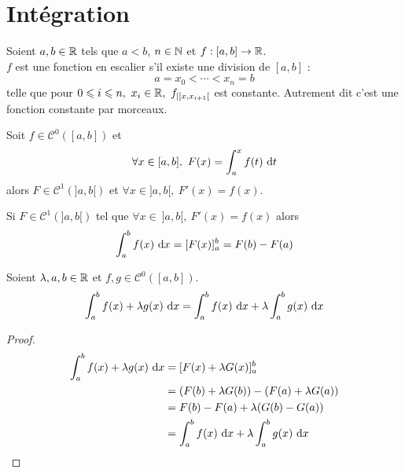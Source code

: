 \chapter{Intégration}
\def\arraystretch{1}

\begin{definition}
	Soient $a, b \in \mathbb{R}$ tels que $a < b$, $n \in \mathbb{N}$ et $f : [a, b] \to \mathbb{R}$.
	\\
	$f$ est une fonction en escalier s'il existe une division de $[a, b]$ :
	\[ a = x_0 < \cdots < x_n = b \]
	telle que pour $0 \leqslant i \leqslant n,\ x_i \in \mathbb{R},\  f_{| ]x, x_{i+1}[}$ est constante.
	Autrement dit c'est une fonction constante par morceaux.
\end{definition}

\begin{theorem}
	Soit $f \in \mathcal{C}^0([a, b])$ et 
	\begin{align*}
		\forall x \in [a, b],\ F(x) = \int_a^x f(t) \ \diffd t
	\end{align*}
	alors $F \in \mathcal{C}^1(]a, b[)$ et $\forall x \in ]a, b[,\ F'(x) = f(x)$.    
\end{theorem}

\begin{corollary}
    Si $F \in \mathcal{C}^1(]a, b[)$ tel que $\forall x \in \ ]a, b[,\ F'(x) = f(x)$ alors
	\begin{align*}
		\int_a^b f(x) \ \diffd x = [F(x)]_a^b = F(b) - F(a) 
	\end{align*}
\end{corollary}

\begin{proposition}
	Soient $\lambda, a, b \in \mathbb{R}$ et $f, g \in \mathcal{C}^0([a, b])$.
	\begin{align*}
		\int_a^b f(x) + \lambda g(x) \ \diffd x = \int_a^b f(x) \ \diffd x + \lambda \int_a^b g(x) \ \diffd x 
	\end{align*}
\end{proposition}

\begin{proof}
    \begin{align*}
        \int_{a}^{b} f(x) + \lambda g(x) \ \diffd x &= [F(x) + \lambda G(x)]_a^b \\
                                                    &= (F(b) + \lambda G(b)) - (F(a) + \lambda G(a)) \\
                                                    &= F(b) - F(a) + \lambda (G(b) - G(a)) \\
                                                    &= \int_{a}^{b} f(x) \ \diffd x + \lambda \int_{a}^{b} g(x) \ \diffd x
    \end{align*}
\end{proof}

